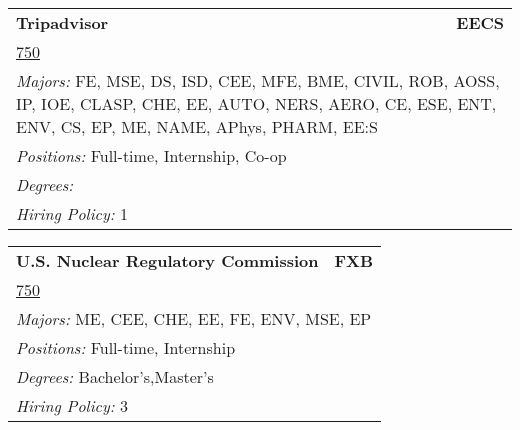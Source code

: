 \documentclass[twoside]{article}
\begin{document}
\begin{center}
\begin{multicols}{3}
\begin{FlushLeft}
\begin{minipage}{\columnwidth}
\end{minipage}
 
\begin{minipage}{\columnwidth}\begin{tabularx}{.95\columnwidth}{Xr}
                 {\Large\bf Tripadvisor} & {\Large\bf EECS}\\
    \multicolumn{2}{p{.95\columnwidth}}{\url{750}}\\
    \multicolumn{2}{p{.95\columnwidth}}{\emph{Majors:} FE, MSE, DS, ISD, CEE, MFE, BME, CIVIL, ROB, AOSS, IP, IOE, CLASP, CHE, EE, AUTO, NERS, AERO, CE, ESE, ENT, ENV, CS, EP, ME, NAME, APhys, PHARM, EE:S}\\
    \multicolumn{2}{p{.95\columnwidth}}{\emph{Positions:} Full-time, Internship, Co-op}\\
    \multicolumn{2}{p{.95\columnwidth}}{\emph{Degrees:} }\\
    \multicolumn{2}{p{.95\columnwidth}}{\emph{Hiring Policy:} 1}\\
    \end{tabularx}
    
\end{minipage}
 
\begin{minipage}{\columnwidth}\begin{tabularx}{.95\columnwidth}{Xr}
                 {\Large\bf U.S. Nuclear Regulatory Commission} & {\Large\bf FXB}\\
    \multicolumn{2}{p{.95\columnwidth}}{\url{750}}\\
    \multicolumn{2}{p{.95\columnwidth}}{\emph{Majors:} ME, CEE, CHE, EE, FE, ENV, MSE, EP}\\
    \multicolumn{2}{p{.95\columnwidth}}{\emph{Positions:} Full-time, Internship}\\
    \multicolumn{2}{p{.95\columnwidth}}{\emph{Degrees:} Bachelor's,Master's}\\
    \multicolumn{2}{p{.95\columnwidth}}{\emph{Hiring Policy:} 3}\\
    \end{tabularx}
    
\end{minipage}
 

\end{FlushLeft}
\end{multicols}
\end{center}
\end{document}
